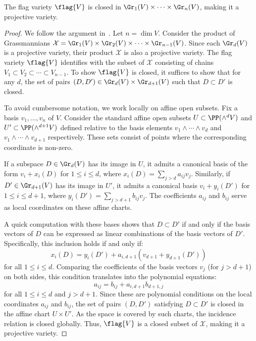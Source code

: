 \begin{theorem}
    The flag variety $\flag{V}$ is closed in $\Gr_1(V) \times \cdots \times \Gr_n(V)$, making it a projective variety.
\end{theorem}
\begin{proof}
    We follow the argument in~\cite[Section~1.8]{humphreys_linear_1975}. Let $n = \dim V$. Consider the product of Grassmannians $\mathcal{X} = \Gr_1(V) \times \Gr_2(V) \times \cdots \times \Gr_{n-1}(V)$. Since each $\Gr_d(V)$ is a projective variety, their product $\mathcal{X}$ is also a projective variety. The flag variety $\flag{V}$ identifies with the subset of $\mathcal{X}$ consisting of chains $V_1 \subset V_2 \subset \cdots \subset V_{n-1}$. To show $\flag{V}$ is closed, it suffices to show that for any $d$, the set of pairs $(D, D') \in \Gr_d(V) \times \Gr_{d+1}(V)$ such that $D \subset D'$ is closed.

    To avoid cumbersome notation, we work locally on affine open subsets. Fix a basis $v_1, \ldots, v_n$ of $V$. Consider the standard affine open subsets $U \subset \PP(\wedge^d V)$ and $U' \subset \PP(\wedge^{d+1} V)$ defined relative to the basis elements $v_1 \wedge \cdots \wedge v_d$ and $v_1 \wedge \cdots \wedge v_{d+1}$ respectively. These sets consist of points where the corresponding coordinate is non-zero. 
    
    If a subspace $D \in \Gr_d(V)$ has its image in $U$, it admits a canonical basis of the form $v_i + x_i(D)$ for $1 \leq i \leq d$, where $x_i(D) = \sum_{j > d} a_{ij} v_j$. Similarly, if $D' \in \Gr_{d+1}(V)$ has its image in $U'$, it admits a canonical basis $v_i + y_i(D')$ for $1 \leq i \leq d+1$, where $y_i(D') = \sum_{j > d+1} b_{ij} v_j$. The coefficients $a_{ij}$ and $b_{ij}$ serve as local coordinates on these affine charts.

    A quick computation with these bases shows that $D \subset D'$ if and only if the basis vectors of $D$ can be expressed as linear combinations of the basis vectors of $D'$. Specifically, this inclusion holds if and only if:
    \[ x_i(D) = y_i(D') + a_{i, d+1}(v_{d+1} + y_{d+1}(D')) \]
    for all $1 \leq i \leq d$. Comparing the coefficients of the basis vectors $v_j$ (for $j > d+1$) on both sides, this condition translates into the polynomial equations:
    \[ a_{ij} = b_{ij} + a_{i, d+1} b_{d+1, j} \]
    for all $1 \leq i \leq d$ and $j > d+1$. Since these are polynomial conditions on the local coordinates $a_{ij}$ and $b_{ij}$, the set of pairs $(D, D')$ satisfying $D \subset D'$ is closed in the affine chart $U \times U'$. As the space is covered by such charts, the incidence relation is closed globally. Thus, $\flag{V}$ is a closed subset of $\mathcal{X}$, making it a projective variety.
\end{proof}
